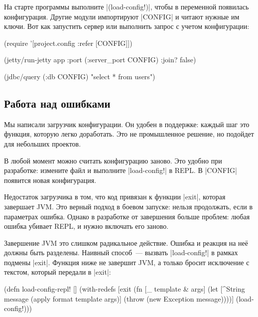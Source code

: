 На старте программы выполните \spverb|(load-config!)|, чтобы в переменной
появилась конфигурация. Другие модули импортируют \spverb|CONFIG| и читают
нужные им ключи. Вот как запустить сервер или выполнить запрос с учетом
конфигурации:


\begin{english}
  \begin{clojure}
(require '[project.config :refer [CONFIG]])

(jetty/run-jetty app {:port (:server_port CONFIG)
                      :join? false})

(jdbc/query (:db CONFIG) "select * from users")
  \end{clojure}
\end{english}

\subsection{Работа над ошибками}

Мы написали загрузчик конфигурации. Он удобен в поддержке: каждый шаг это
функция, которую легко доработать. Это не промышленное решение, но подойдет для
небольших проектов.

В любой момент можно считать конфигурацию заново. Это удобно при разработке:
измените файл и выполните \spverb|load-config!| в REPL. В \spverb|CONFIG|
появится новая конфигурация.


Недостаток загрузчика в том, что код привязан к функции \spverb|exit|, которая
завершает JVM. Это верный подход в боевом запуске: нельзя продолжать, если в
параметрах ошибка. Однако в разработке от завершения больше проблем: любая
ошибка убивает REPL, и нужно включать его заново.

Завершение JVM это слишком радикальное действие. Ошибка и реакция на не\"{е}
должны быть разделены. Наивный способ~--- вызвать \spverb|load-config!| в рамках
подмены \spverb|exit|. Функция ниже не завершит JVM, а только бросит исключение
с текстом, который передали в \spverb|exit|:

\begin{english}
  \begin{clojure}
(defn load-config-repl! []
  (with-redefs
    [exit (fn [_ template & args]
            (let [^String message
                  (apply format template args)]
              (throw (new Exception message))))]
    (load-config!)))
  \end{clojure}
\end{english}

